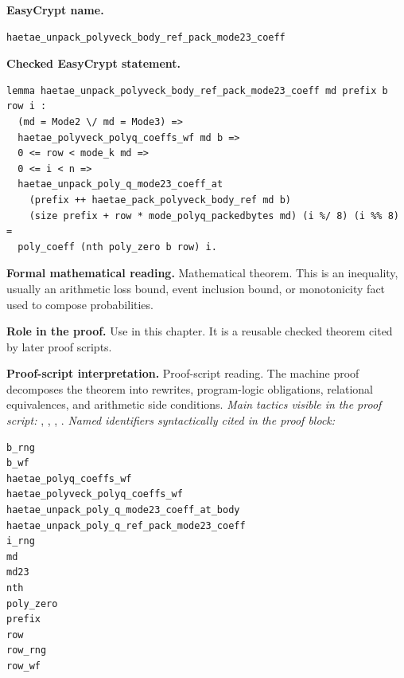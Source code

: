 \begin{formaltheorem}
\noindent\textbf{EasyCrypt name.}
\begin{lstlisting}[language=EasyCrypt,basicstyle=\ttfamily\scriptsize]
haetae_unpack_polyveck_body_ref_pack_mode23_coeff
\end{lstlisting}
\noindent\textbf{Checked EasyCrypt statement.}
\begin{lstlisting}[language=EasyCrypt,basicstyle=\ttfamily\scriptsize]
lemma haetae_unpack_polyveck_body_ref_pack_mode23_coeff md prefix b row i :
  (md = Mode2 \/ md = Mode3) =>
  haetae_polyveck_polyq_coeffs_wf md b =>
  0 <= row < mode_k md =>
  0 <= i < n =>
  haetae_unpack_poly_q_mode23_coeff_at
    (prefix ++ haetae_pack_polyveck_body_ref md b)
    (size prefix + row * mode_polyq_packedbytes md) (i %/ 8) (i %% 8) =
  poly_coeff (nth poly_zero b row) i.
\end{lstlisting}
\noindent\textbf{Formal mathematical reading.}
Mathematical theorem. This is an inequality, usually an arithmetic loss bound, event inclusion bound, or monotonicity fact used to compose probabilities.

\noindent\textbf{Role in the proof.}
Use in this chapter. It is a reusable checked theorem cited by later proof scripts.

\noindent\textbf{Proof-script interpretation.}
Proof-script reading. The machine proof decomposes the theorem into rewrites, program-logic obligations, relational equivalences, and arithmetic side conditions.
\emph{Main tactics visible in the proof script:} , , , .
\emph{Named identifiers syntactically cited in the proof block:}
\begin{lstlisting}[language=EasyCrypt,basicstyle=\ttfamily\scriptsize]
b_rng
b_wf
haetae_polyq_coeffs_wf
haetae_polyveck_polyq_coeffs_wf
haetae_unpack_poly_q_mode23_coeff_at_body
haetae_unpack_poly_q_ref_pack_mode23_coeff
i_rng
md
md23
nth
poly_zero
prefix
row
row_rng
row_wf
\end{lstlisting}

\end{formaltheorem}

